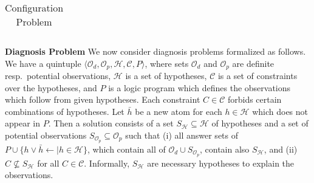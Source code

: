\documentclass[11pt,fleqn,twoside]{article}
\newcommand{\leanparagraph}[1]{\smallskip\noindent\textbf{#1}}
\begin{document}
{\begin{table}[t]
\begin{tabular}[t]{|r|r|r|r|r|r|r|r|r|r|r|r|r|r|r|}
					\hline
				\end{tabular}
				\caption{Configuration Problem}
				\label{tab:abstractConf}
			\end{table}
}

			\leanparagraph{Diagnosis Problem}
			We now consider diagnosis problems formalized as follows.
			We have a quintuple $\langle \mathcal{O}_d, \mathcal{O}_p, \mathcal{H}, \mathcal{C}, P \rangle$,
			where
			sets $\mathcal{O}_d$ and $\mathcal{O}_p$ are definite resp.~potential observations,
			$\mathcal{H}$ is a set of hypotheses, $\mathcal{C}$ is a set of constraints over the hypotheses,
			and $P$ is a logic program which defines the observations which follow from given hypotheses.
			Each constraint $C \in \mathcal{C}$ forbids certain combinations of hypotheses.
			Let $\bar{h}$ be a new atom for each $h \in \mathcal{H}$ which does not appear in $P$.
			Then a solution consists of a set $S_{\mathcal{H}} \subseteq \mathcal{H}$
			of hypotheses and a set of potential observations $S_{\mathcal{O}_p} \subseteq {\mathcal{O}}_p$
			such that (i)
			all answer sets of $P \cup \{ h \vee \bar{h} \leftarrow \mid h \in \mathcal{H} \}$, which contain all of $\mathcal{O}_d \cup S_{\mathcal{O}_p}$, contain also $S_{\mathcal{H}}$,
			and (ii)
			$C \not\subseteq S_{\mathcal{H}}$ for all $C \in \mathcal{C}$.
			Informally, $S_{\mathcal{H}}$ are necessary hypotheses to explain the observations.
\end{document}
